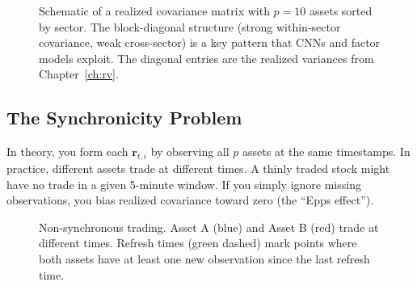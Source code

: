 \begin{figure}[ht]
\caption{Schematic of a realized covariance matrix with $p = 10$ assets sorted
by sector. The block-diagonal structure (strong within-sector covariance, weak
cross-sector) is a key pattern that CNNs and factor models exploit. The diagonal
entries are the realized variances from Chapter~\ref{ch:rv}.}
\label{fig:rc-heatmap}
\end{figure}

\subsection{The Synchronicity Problem}

In theory, you form each $\mathbf{r}_{t,i}$ by observing all $p$ assets at the
same timestamps. In practice, different assets trade at different times. A
thinly traded stock might have no trade in a given 5-minute window. If you
simply ignore missing observations, you bias realized covariance toward zero
(the ``Epps effect'').

\begin{figure}[ht]
\centering
{}
\caption{Non-synchronous trading. Asset A (blue) and Asset B (red) trade at
different times. Refresh times (green dashed) mark points where both assets
have at least one new observation since the last refresh time.}
\label{fig:nonsync}
\end{figure}

